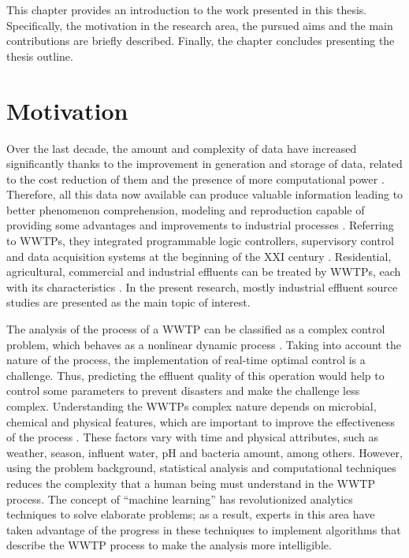 This chapter provides an introduction to the work presented in this thesis. Specifically, the motivation in the research area, the pursued aims and the main contributions are briefly described. Finally, the chapter concludes presenting the thesis outline.

\section{Motivation}
\label{s:Motivation}

Over the last decade, the amount and complexity of data have increased significantly thanks to the improvement in generation and storage of data, related to the cost reduction of them and the presence of more computational power \cite{Romero2017}. Therefore, all this data now available can produce valuable information leading to better phenomenon comprehension, modeling and reproduction capable of providing some advantages and improvements to industrial processes \cite{Sbroiavacca2018}. Referring to \ac{WWTP}s, they integrated programmable logic controllers, supervisory control and data acquisition systems at the beginning of the XXI century \cite{Newhart2019}. Residential, agricultural, commercial and industrial effluents can be treated by \ac{WWTP}s, each with its characteristics \cite{Nourani2018}. In the present research, mostly industrial effluent source studies are presented as the main topic of interest.

The analysis of the process of a \ac{WWTP} can be classified as a complex control problem, which behaves as a nonlinear dynamic process \cite{Pang2019}. Taking into account the nature of the process, the implementation of real-time optimal control is a challenge. Thus, predicting the effluent quality of this operation would help to control some parameters to prevent disasters and make the challenge less complex. Understanding the \ac{WWTP}s complex nature depends on microbial, chemical and physical features, which are important to improve the effectiveness of the process \cite{Li2013}. These factors vary with time and physical attributes, such as weather, season, influent water, pH and bacteria amount, among others. However, using the problem background, statistical analysis and computational techniques reduces the complexity that a human being must understand in the \ac{WWTP} process. The concept of “machine learning” has revolutionized analytics techniques to solve elaborate problems; as a result, experts in this area have taken advantage of the progress in these techniques to implement algorithms that describe the \ac{WWTP} process to make the analysis more intelligible.

